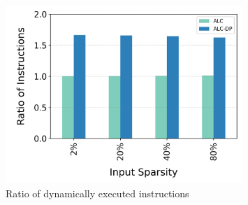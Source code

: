 \begin{figure}[h!]
  \includegraphics[width=0.8\textwidth]{Figures/Evaluations/if_then_else_many_scatter_instr.png}
  \caption{Ratio of dynamically executed instructions}
  \label{fig:if-then-else-many-scatter-inst}
\end{figure}

